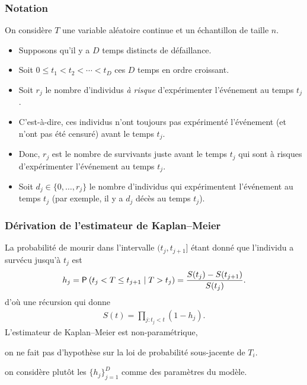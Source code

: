 \documentclass{beamer}
\begin{document}
\begin{frame}
\frametitle{Notation}
On considère $T$ une variable aléatoire continue et un échantillon de taille $n$.
\begin{itemize}
\item Supposons qu'il y a $D$ temps distincts de défaillance. 
\item Soit $0 \leq t_1 < t_2 < \cdots < t_D$ ces $D$ temps en ordre croissant. 
\item Soit $r_j$ le nombre d'individus \emph{à risque} d'expérimenter l'événement au temps $t_j$ . 
\bi
\item C'est-à-dire, ces individus n'ont toujours pas expérimenté l'événement (et n'ont pas été censuré) avant le temps $t_j$. 
\item Donc, $r_j$ est le nombre de survivants juste avant le temps $t_j$ qui sont à risques d'expérimenter l'événement au temps $t_j$.
\ei
\item Soit $d_j \in \{0, \ldots, r_j\}$ le nombre d'individus qui expérimentent l'événement au temps $t_j$ (par exemple, il y a $d_j$ décès au temps $t_j$). 
\end{itemize}
\end{frame}
\begin{frame}
\frametitle{Dérivation de l'estimateur de Kaplan--Meier}
 La probabilité de mourir dans l'intervalle $(t_j, t_{j+1}]$ étant donné que l'individu a survécu jusqu'à $t_j$ est 
 \begin{align*}
  h_j = \P{t_j < T \leq t_{j+1} \mid T > t_j} 
  = \frac{S(t_j) - S(t_{j+1})}{S(t_j)}.
 \end{align*}
d'où une récursion qui donne \begin{align*}
S(t) = \prod_{j: t_j < t} (1-h_j).
\end{align*}
L'estimateur de Kaplan--Meier  est \alert{non-paramétrique}, 
\bi \item on ne fait pas d'hypothèse sur la loi de probabilité sous-jacente de  $T_i$.
\item on considère plutôt les $\{h_j\}_{j=1}^D$ comme des paramètres du modèle.
\ei
\end{frame}
\end{document}
